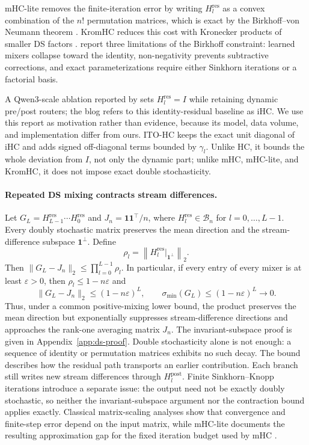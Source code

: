 \documentclass{article}
\newcommand{\Hpost}{H^{\mathrm{post}}}
\newcommand{\Hres}{H^{\mathrm{res}}}
\begin{document}
mHC-lite removes the finite-iteration error by writing $\Hres_l$ as a convex combination of the $n!$ permutation matrices, which is exact by the Birkhoff--von Neumann theorem \citep{birkhoff1946,vonneumann1953,yang2026mhclite}.
KromHC reduces this cost with Kronecker products of smaller DS factors \citep{zhou2026kromhc}.
\citet{liu2026shc} report three limitations of the Birkhoff constraint: learned mixers collapse toward the identity, non-negativity prevents subtractive corrections, and exact parameterizations require either Sinkhorn iterations or a factorial basis.

A Qwen3-scale ablation reported by \citet{shuang2026deepseek}
sets $\Hres_l=I$ while retaining dynamic pre/post routers; the blog refers to this identity-residual baseline as iHC.
We use this report as motivation rather than evidence, because its model, data volume, and implementation differ from ours.
ITO-HC keeps the exact unit diagonal of iHC and adds signed off-diagonal terms bounded by $\gamma_l$.
Unlike HC, it bounds the whole deviation from $I$, not only the dynamic part; unlike mHC, mHC-lite, and KromHC, it does not impose exact double stochasticity.

\paragraph{Repeated DS mixing contracts stream differences.}
Let $G_L=\Hres_{L-1}\cdots\Hres_0$ and $J_n=\mathbf 1\mathbf 1^\top/n$, where $\Hres_l\in\mathcal B_n$ for $l=0,\ldots,L-1$. Every doubly stochastic matrix preserves the mean direction and the stream-difference subspace $\mathbf 1^\perp$. Define
\begin{equation}
 \rho_l=\left\|\Hres_l\big|_{\mathbf 1^\perp}\right\|_2.
 \label{eq:ds-contraction}
\end{equation}
Then $\|G_L-J_n\|_2\leq\prod_{l=0}^{L-1}\rho_l$. In particular, if every entry of every mixer is at least $\varepsilon>0$, then $\rho_l\leq1-n\varepsilon$ and
\begin{equation}
 \|G_L-J_n\|_2\leq(1-n\varepsilon)^L,\qquad
 \sigma_{\min}(G_L)\leq(1-n\varepsilon)^L\longrightarrow0.
 \label{eq:ds-smin-decay}
\end{equation}
Thus, under a common positive-mixing lower bound, the product preserves the mean direction but exponentially suppresses stream-difference directions and approaches the rank-one averaging matrix $J_n$. The invariant-subspace proof is given in Appendix~\ref{app:ds-proof}. Double stochasticity alone is not enough: a sequence of identity or permutation matrices exhibits no such decay. 
The bound describes how the residual path transports an earlier contribution. Each branch still writes new stream differences through $\Hpost_l$.
Finite Sinkhorn--Knopp iterations introduce a separate issue: the output need not be exactly doubly stochastic, so neither the invariant-subspace argument nor the contraction bound applies exactly. Classical matrix-scaling analyses show that convergence and finite-step error depend on the input matrix, while mHC-lite documents the resulting approximation gap for the fixed iteration budget used by mHC \citep{linial1998scaling,franklin1989scaling,knight2008sinkhorn,chakrabarty2021sinkhorn,yang2026mhclite}.
\end{document}
